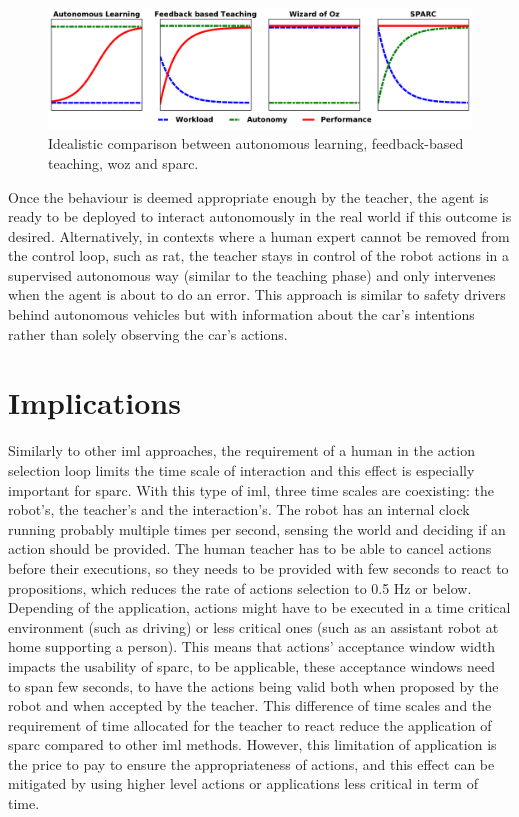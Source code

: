 \begin{figure}[ht]
	\includegraphics[width=1\linewidth]{concept.pdf}
	\centering
	\caption{Idealistic comparison between autonomous learning, feedback-based teaching, \gls{woz} and \gls{sparc}.}
	\label{fig:concept}
\end{figure}

Once the behaviour is deemed appropriate enough by the teacher, the agent is ready to be deployed to interact autonomously in the real world if this outcome is desired. Alternatively, in contexts where a human expert cannot be removed from the control loop, such as \acrlong{rat}, the teacher stays in control of the robot actions in a supervised autonomous way (similar to the teaching phase) and only intervenes when the agent is about to do an error. This approach is similar to safety drivers behind autonomous vehicles but with information about the car's intentions rather than solely observing the car's actions. 

\section{Implications}

Similarly to other \gls{iml} approaches, the requirement of a human in the action selection loop limits the time scale of interaction and this effect is especially important for \gls{sparc}. With this type of \gls{iml}, three time scales are coexisting: the robot's, the teacher's and the interaction's. The robot has an internal clock running probably multiple times per second, sensing the world and deciding if an action should be provided. The human teacher has to be able to cancel actions before their executions, so they needs to be provided with few seconds to react to propositions, which reduces the rate of actions selection to 0.5 Hz or below. Depending of the application, actions might have to be executed in a time critical environment (such as driving) or less critical ones (such as an assistant robot at home supporting a person). This means that actions' acceptance window width impacts the usability of \gls{sparc}, to be applicable, these acceptance windows need to span few seconds, to have the actions being valid both when proposed by the robot and when accepted by the teacher. This difference of time scales and the requirement of time allocated for the teacher to react reduce the application of \gls{sparc} compared to other \gls{iml} methods. However, this limitation of application is the price to pay to ensure the appropriateness of actions, and this effect can be mitigated by using higher level actions or applications less critical in term of time.  %

